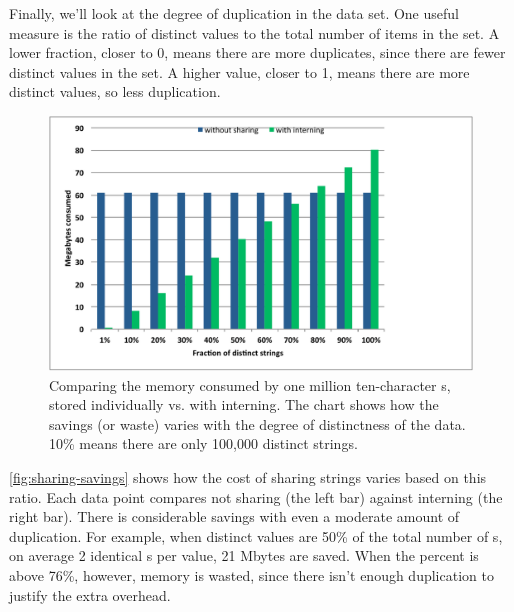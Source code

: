 Finally, we'll look at the degree of duplication in the data set. One
useful measure is the ratio of distinct values to the total number of items in the set. 
A lower fraction, closer to 0, means there are more duplicates, since
there are fewer distinct values in the set. A higher value, closer to 1, means
there are more distinct values, so less duplication. 

\begin{figure}
\centering
\includegraphics[width=\textwidth]{part1/Figures/modelingdatatypes/sharingpool_consumptionchart.pdf}
	\caption{Comparing the memory consumed by
	one million ten-character s, stored individually vs. with
	interning.
	The chart shows how the savings (or waste) varies with the degree of
	distinctness of the data. 10\%
	means there are only 100,000 distinct strings.}
	\label{fig:sharing-savings}
\end{figure}

\autoref{fig:sharing-savings} shows how the cost of sharing strings
varies based on this ratio. Each data point compares not sharing
(the left bar) against
interning (the right bar). There is considerable savings with even
a moderate amount of duplication. For example, when distinct values
are 50\% of the total number of s, on average 2 identical
s per value, 21 Mbytes are saved. When the
percent is above 76\%, however, memory is wasted, since there isn't enough
duplication to justify the extra overhead.


